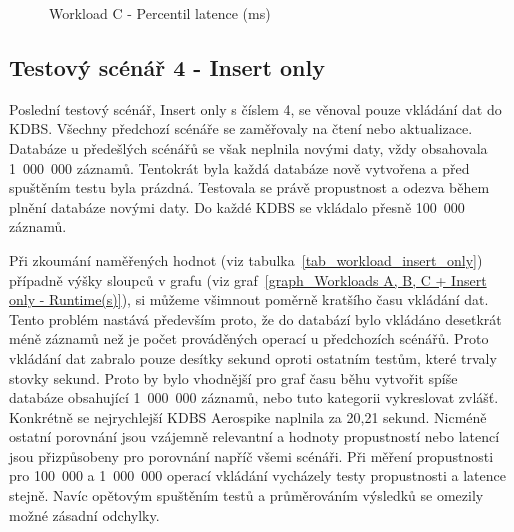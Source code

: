 \documentclass[czech,master,dept460,male,csharp,cpdeclaration]{diploma}
\begin{document}
	\begin{figure}
		\centering
		\caption{Workload C - Percentil latence (ms)}
		\label{graph_Workload C - Percentile Latency (ms)}
	\end{figure}
	
	\subsection{Testový scénář 4 - Insert only} 
	
	Poslední testový scénář, Insert only s číslem 4, se věnoval pouze vkládání dat do KDBS. Všechny předchozí scénáře se zaměřovaly na čtení nebo aktualizace. Databáze u předešlých scénářů se však neplnila novými daty, vždy obsahovala 1~000~000 záznamů. Tentokrát byla každá databáze nově vytvořena a před spuštěním testu byla prázdná. Testovala se právě propustnost a odezva během plnění databáze novými daty. Do každé KDBS se vkládalo přesně 100~000 záznamů.
	
	Při zkoumání naměřených hodnot (viz tabulka~\ref{tab_workload_insert_only}) případně výšky sloupců v grafu (viz graf~\ref{graph_Workloads A, B, C + Insert only - Runtime(s)}), si můžeme všimnout poměrně kratšího času vkládání dat. Tento problém nastává především proto, že do databází bylo vkládáno desetkrát méně záznamů než je počet prováděných operací u předchozích scénářů. Proto vkládání dat zabralo pouze desítky sekund oproti ostatním testům, které trvaly stovky sekund. Proto by bylo vhodnější pro graf času běhu vytvořit spíše databáze obsahující 1~000~000 záznamů, nebo tuto kategorii vykreslovat zvlášť. Konkrétně se nejrychlejší KDBS Aerospike naplnila za 20,21 sekund. Nicméně ostatní porovnání jsou vzájemně relevantní a hodnoty propustností nebo latencí jsou přizpůsobeny pro porovnání napříč všemi scénáři. Při měření propustnosti pro 100~000 a 1~000~000 operací vkládání vycházely testy propustnosti a latence stejně. Navíc opětovým spuštěním testů a průměrováním výsledků se omezily možné zásadní odchylky.
	
\end{document}
